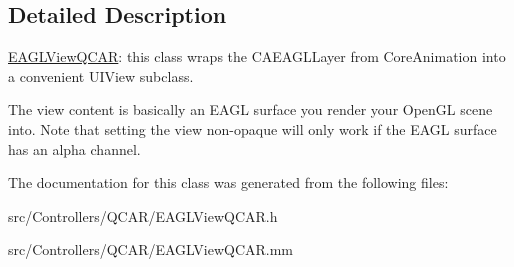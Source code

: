 \subsection{\-Detailed \-Description}
\hyperlink{interface_e_a_g_l_view_q_c_a_r}{\-E\-A\-G\-L\-View\-Q\-C\-A\-R}\-: this class wraps the \-C\-A\-E\-A\-G\-L\-Layer from \-Core\-Animation into a convenient \-U\-I\-View subclass. 

\-The view content is basically an \-E\-A\-G\-L surface you render your \-Open\-G\-L scene into. \-Note that setting the view non-\/opaque will only work if the \-E\-A\-G\-L surface has an alpha channel. 

\-The documentation for this class was generated from the following files\-:\begin{DoxyCompactItemize}
\item 
src/\-Controllers/\-Q\-C\-A\-R/\-E\-A\-G\-L\-View\-Q\-C\-A\-R.\-h\item 
src/\-Controllers/\-Q\-C\-A\-R/\-E\-A\-G\-L\-View\-Q\-C\-A\-R.\-mm\end{DoxyCompactItemize}
